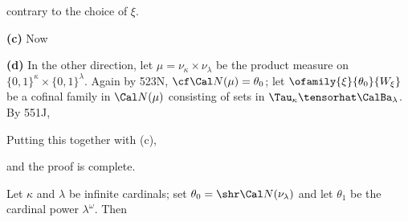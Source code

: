 {

\noindent contrary to the choice of $\xi$.\ \Bang\Qed

\medskip

{\bf (c)} Now


\medskip

{\bf (d)} In the other direction, let
$\mu=\nu_{\kappa}\times\nu_{\lambda}$ be the product measure on
$\{0,1\}^{\kappa}\times\{0,1\}^{\lambda}$.   Again by 523N,
$\cf\Cal N(\mu)=\theta_0$;  let $\ofamily{\xi}{\theta_0}{W_{\xi}}$ be a
cofinal family in $\Cal N(\mu)$ consisting of sets in
$\Tau_{\kappa}\tensorhat\CalBa_{\lambda}$.   By 551J,


\noindent Putting this together with (c),


\noindent and the proof is complete.
}%


 Let $\kappa$ and $\lambda$ be infinite cardinals;
set $\theta_0=\shr\Cal N(\nu_{\lambda})$ and let
$\theta_1$ be the cardinal power $\lambda^{\omega}$.
Then


